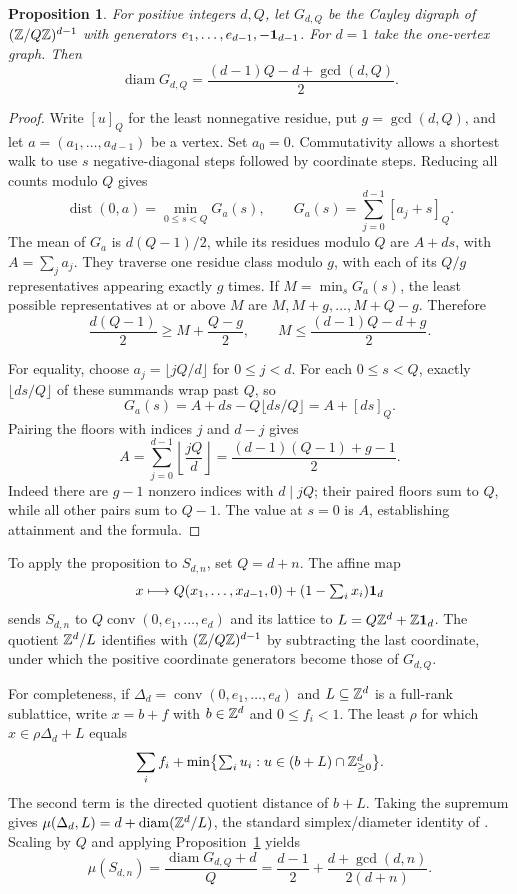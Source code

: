\documentclass[11pt,a4paper]{article}
\newtheorem{proposition}[theorem]{Proposition}
\theoremstyle{remark}\newtheorem{remark}[theorem]{Remark}
\DeclareMathOperator{\conv}{conv}
\begin{document}
\begin{proposition}\label{d:graph-diameter}
For positive integers $d,Q$, let $G_{d,Q}$ be the Cayley digraph of
$(\mathbb Z/Q\mathbb Z)^{d-1}$ with generators
$e_1,\ldots,e_{d-1},-\mathbf1_{d-1}$. For $d=1$ take the one-vertex
graph. Then
\[
 \operatorname{diam}G_{d,Q}
 =\frac{(d-1)Q-d+\gcd(d,Q)}2.
\]
\end{proposition}
\begin{proof}
Write $[u]_Q$ for the least nonnegative residue, put $g=\gcd(d,Q)$,
and let $a=(a_1,\ldots,a_{d-1})$ be a vertex. Set $a_0=0$.
Commutativity allows a shortest walk to use $s$ negative-diagonal
steps followed by coordinate steps. Reducing all counts modulo $Q$
gives
\[
 \operatorname{dist}(0,a)
 =\min_{0\le s<Q}G_a(s),\qquad
 G_a(s)=\sum_{j=0}^{d-1}[a_j+s]_Q.
\]
The mean of $G_a$ is $d(Q-1)/2$, while its residues modulo $Q$
are $A+ds$, with $A=\sum_j a_j$. They traverse one residue class
modulo $g$, with each of its $Q/g$ representatives appearing
exactly $g$ times. If $M=\min_s G_a(s)$, the least possible
representatives at or above $M$ are
$M,M+g,\ldots,M+Q-g$. Therefore
\[
 \frac{d(Q-1)}2\ge M+\frac{Q-g}{2},
 \qquad M\le\frac{(d-1)Q-d+g}{2}.
\]

For equality, choose $a_j=\lfloor jQ/d\rfloor$ for $0\le j<d$.
For each $0\le s<Q$, exactly $\lfloor ds/Q\rfloor$ of these
summands wrap past $Q$, so
\[
 G_a(s)=A+ds-Q\lfloor ds/Q\rfloor=A+[ds]_Q.
\]
Pairing the floors with indices $j$ and $d-j$ gives
\[
 A=\sum_{j=0}^{d-1}\left\lfloor\frac{jQ}{d}\right\rfloor
 =\frac{(d-1)(Q-1)+g-1}{2}.
\]
Indeed there are $g-1$ nonzero indices with $d\mid jQ$; their
paired floors sum to $Q$, while all other pairs sum to $Q-1$.
The value at $s=0$ is $A$, establishing attainment and the formula.
\end{proof}

To apply the proposition to $S_{d,n}$, set $Q=d+n$. The affine map
\[
 x\longmapsto Q(x_1,\ldots,x_{d-1},0)
       +(1-\textstyle\sum_i x_i)\mathbf1_d
\]
sends $S_{d,n}$ to $Q\conv(0,e_1,\ldots,e_d)$ and its lattice to
$L=Q\mathbb Z^d+\mathbb Z\mathbf1_d$. The quotient $\mathbb Z^d/L$ identifies with
$(\mathbb Z/Q\mathbb Z)^{d-1}$ by subtracting the last coordinate, under which
the positive coordinate generators become those of $G_{d,Q}$.

For completeness, if $\Delta_d=\conv(0,e_1,\ldots,e_d)$ and
$L\subseteq\mathbb Z^d$ is a full-rank sublattice, write $x=b+f$ with
$b\in\mathbb Z^d$ and $0\le f_i<1$. The least $\rho$ for which
$x\in\rho\Delta_d+L$ equals
\[
 \sum_i f_i+
 \min\bigl\{\textstyle\sum_i u_i:
          u\in(b+L)\cap\mathbb Z_{\ge0}^d\bigr\}.
\]
The second term is the directed quotient distance of $b+L$.
Taking the supremum gives
$\mu(\Delta_d,L)=d+\operatorname{diam}(\mathbb Z^d/L)$, the standard
simplex/diameter identity of \cite[Lemma~B.1]{CSS}. Scaling by $Q$
and applying Proposition~\ref{d:graph-diameter} yields
\[
 \mu(S_{d,n})
 =\frac{\operatorname{diam}G_{d,Q}+d}{Q}
 =\frac{d-1}{2}+\frac{d+\gcd(d,n)}{2(d+n)}.
\]
\end{document}
